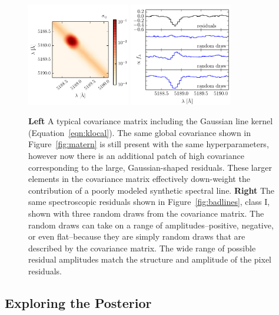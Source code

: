\documentclass[iop,floatfix]{emulateapj}
\begin{document}
\begin{figure}[!htb]
\begin{center}
\includegraphics[width=0.4\textwidth]{figs/gauss_matrix.pdf}
\includegraphics[width=0.4\textwidth]{figs/gauss_draw.pdf}
\caption{\textbf{Left} A typical covariance matrix including the Gaussian line kernel (Equation~\ref{eqn:klocal}). The same global covariance shown in Figure~\ref{fig:matern} is still present with the same hyperparameters, however now there is an additional patch of high covariance corresponding to the large, Gaussian-shaped residuals. These larger elements in the covariance matrix effectively down-weight the contribution of a poorly modeled synthetic spectral line.
\textbf{Right} The same spectroscopic residuals shown in Figure~\ref{fig:badlines}, class I, shown with three random draws from the covariance matrix. The random draws can take on a range of amplitudes--positive, negative, or even flat--because they are simply random draws that are described by the covariance matrix. The wide range of possible residual amplitudes match the structure and amplitude of the pixel residuals.}
\label{fig:region}
\end{center}
\end{figure}


\subsection{Exploring the Posterior }
\label{subsec:MCMC}
\end{document}
